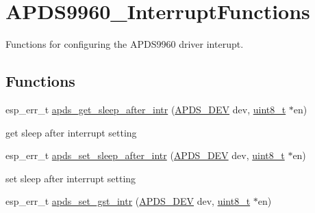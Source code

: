 \hypertarget{group__APDS9960__InterruptFunctions}{}\section{A\+P\+D\+S9960\+\_\+\+Interrupt\+Functions}
\label{group__APDS9960__InterruptFunctions}


Functions for configuring the A\+P\+D\+S9960 driver interupt.  


\subsection*{Functions}
\begin{DoxyCompactItemize}
\item 
esp\+\_\+err\+\_\+t \hyperlink{group__APDS9960__InterruptFunctions_gaaa0f806e72297961b367064be3dcefa4}{apds\+\_\+get\+\_\+sleep\+\_\+after\+\_\+intr} (\hyperlink{structAPDS9960__Driver}{A\+P\+D\+S\+\_\+\+D\+EV} dev, \hyperlink{vl53l0x__types_8h_aba7bc1797add20fe3efdf37ced1182c5}{uint8\+\_\+t} $\ast$en)
\begin{DoxyCompactList}\small\item\em 
\begin{DoxyItemize}
\item get sleep after interrupt setting 
\end{DoxyItemize}\end{DoxyCompactList}\item 
esp\+\_\+err\+\_\+t \hyperlink{group__APDS9960__InterruptFunctions_ga248b95cc344899676855d1d3b7313822}{apds\+\_\+set\+\_\+sleep\+\_\+after\+\_\+intr} (\hyperlink{structAPDS9960__Driver}{A\+P\+D\+S\+\_\+\+D\+EV} dev, \hyperlink{vl53l0x__types_8h_aba7bc1797add20fe3efdf37ced1182c5}{uint8\+\_\+t} $\ast$en)
\begin{DoxyCompactList}\small\item\em 
\begin{DoxyItemize}
\item set sleep after interrupt setting 
\end{DoxyItemize}\end{DoxyCompactList}\item 
esp\+\_\+err\+\_\+t \hyperlink{group__APDS9960__InterruptFunctions_ga11d5a6ed6e4ee037e4b7fac9098e31c8}{apds\+\_\+set\+\_\+gst\+\_\+intr} (\hyperlink{structAPDS9960__Driver}{A\+P\+D\+S\+\_\+\+D\+EV} dev, \hyperlink{vl53l0x__types_8h_aba7bc1797add20fe3efdf37ced1182c5}{uint8\+\_\+t} $\ast$en)
\begin{DoxyCompactList}\small\item\em 

\end{DoxyCompactList}
\end{DoxyCompactItemize}
